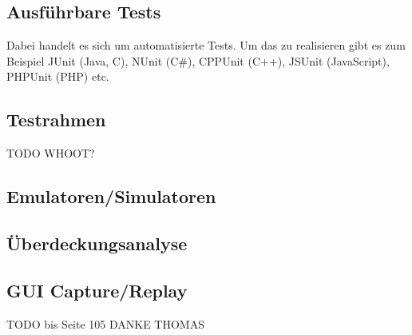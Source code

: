 \subsection{Ausführbare Tests}
Dabei handelt es sich um automatisierte Tests. Um das zu realisieren gibt es zum Beispiel JUnit (Java, C), NUnit (C#), CPPUnit (C++), JSUnit (JavaScript), PHPUnit (PHP) etc.
 
\subsection{Testrahmen}
TODO WHOOT?

\subsection{Emulatoren/Simulatoren}

\subsection{Überdeckungsanalyse}

\subsection{GUI Capture/Replay}

TODO bis Seite 105 DANKE THOMAS
